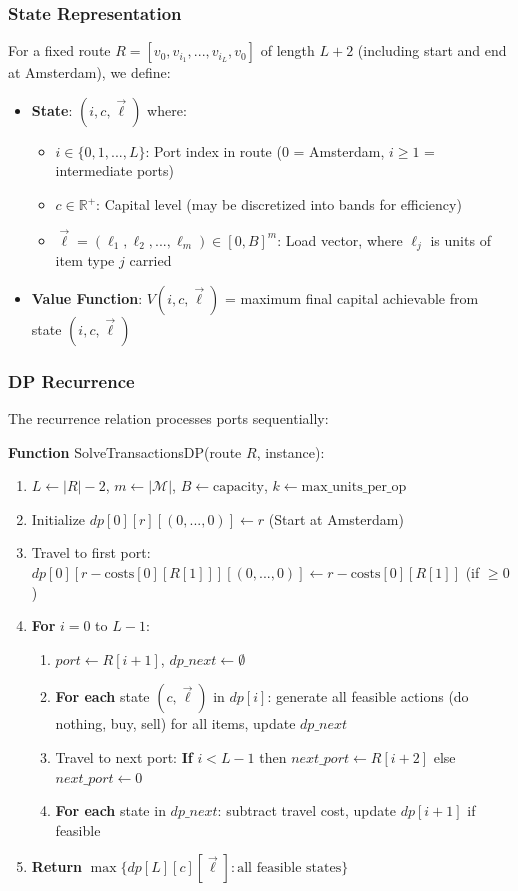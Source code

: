 \documentclass[12pt]{article}
\begin{document}
\subsubsection{State Representation}

For a fixed route $R = [v_0, v_{i_1}, ..., v_{i_L}, v_0]$ of length $L+2$ (including start and end at Amsterdam), we define:

\begin{itemize}
    \item \textbf{State}: $(i, c, \vec{\ell})$ where:
    \begin{itemize}
        \item $i \in \{0, 1, ..., L\}$: Port index in route (0 = Amsterdam, $i \geq 1$ = intermediate ports)
        \item $c \in \mathbb{R}^+$: Capital level (may be discretized into bands for efficiency)
        \item $\vec{\ell} = (\ell_1, \ell_2, ..., \ell_m) \in [0, B]^m$: Load vector, where $\ell_j$ is units of item type $j$ carried
    \end{itemize}
    
    \item \textbf{Value Function}: $V(i, c, \vec{\ell})$ = maximum final capital achievable from state $(i, c, \vec{\ell})$
\end{itemize}

\subsubsection{DP Recurrence}

The recurrence relation processes ports sequentially:

\textbf{Function} SolveTransactionsDP(route $R$, instance):
\begin{enumerate}
    \item $L \gets |R| - 2$, $m \gets |\mathcal{M}|$, $B \gets \text{capacity}$, $k \gets \text{max\_units\_per\_op}$
    \item Initialize $dp[0][r][(0, ..., 0)] \gets r$ (Start at Amsterdam)
    \item Travel to first port: $dp[0][r - \text{costs}[0][R[1]]][(0, ..., 0)] \gets r - \text{costs}[0][R[1]]$ (if $\geq 0$)
    \item \textbf{For} $i = 0$ to $L-1$:
    \begin{enumerate}
        \item $port \gets R[i+1]$, $dp\_next \gets \emptyset$
        \item \textbf{For each} state $(c, \vec{\ell})$ in $dp[i]$: generate all feasible actions (do nothing, buy, sell) for all items, update $dp\_next$
        \item Travel to next port: \textbf{If} $i < L-1$ then $next\_port \gets R[i+2]$ else $next\_port \gets 0$
        \item \textbf{For each} state in $dp\_next$: subtract travel cost, update $dp[i+1]$ if feasible
    \end{enumerate}
    \item \textbf{Return} $\max\{dp[L][c][\vec{\ell}] : \text{all feasible states}\}$
\end{enumerate}
\end{document}
